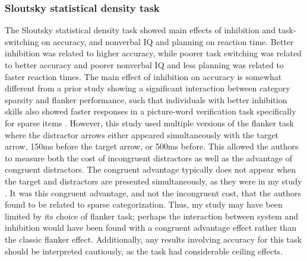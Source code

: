 \documentclass[../dissertation.tex]{subfiles}
\begin{document}
\subsubsection{Sloutsky statistical density task}
	The Sloutsky statistical density task showed main effects of inhibition and task-switching on accuracy, and nonverbal IQ and planning on reaction time. Better inhibition was related to higher accuracy, while poorer task switching was related to better accuracy and poorer nonverbal IQ and less planning was related to faster reaction times. The main effect of inhibition on accuracy is somewhat different from a prior study showing a significant interaction between category sparsity and flanker performance, such that individuals with better inhibition skills also showed faster responses in a picture-word verification task specifically for sparse items \citep{Perry2016}. However, this study used multiple versions of the flanker task where the distractor arrows either appeared simultaneously with the target arrow, 150ms before the target arrow, or 500ms before. This allowed the authors to measure both the cost of incongruent distractors as well as the advantage of congruent distractors. The congruent advantage typically does not appear when the target and distractors are presented simultaneously, as they were in my study \citep{Botella2002}. It was this congruent advantage, and not the incongruent cost, that the authors found to be related to sparse categorization. Thus, my study may have been limited by its choice of flanker task; perhaps the interaction between system and inhibition would have been found with a congruent advantage effect rather than the classic flanker effect. Additionally, any results involving accuracy for this task should be interpreted cautiously, as the task had considerable ceiling effects. \par 
\end{document}
